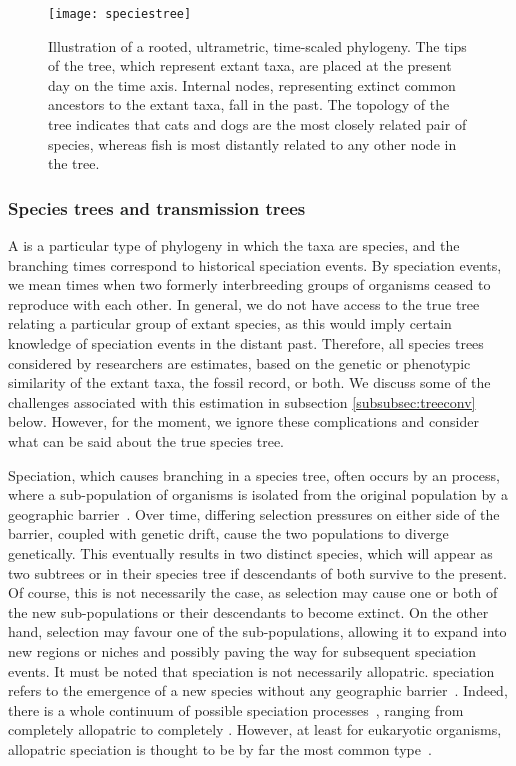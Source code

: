 \begin{figure}[ht]
  \centering
  \label{fig:speciestree}
  \texttt{[image: speciestree]}
  \caption[Illustration of a rooted, ultrametric, time-scaled phylogeny]
    {Illustration of a rooted, ultrametric, time-scaled phylogeny. The tips of
      the tree, which represent extant taxa, are placed at the present day on
      the time axis. Internal nodes, representing extinct common ancestors to
      the extant taxa, fall in the past. The topology of the tree indicates
      that cats and dogs are the most closely related pair of species, whereas
      fish is most distantly related to any other node in the tree.}
\end{figure}

\subsubsection{Species trees and transmission trees}
\label{subsubsec:speciestree}

A  is a particular type of phylogeny in which the taxa are
species, and the branching times correspond to historical speciation events. By
speciation events, we mean times when two formerly interbreeding groups of
organisms ceased to reproduce with each other. In general, we do not have
access to the true tree relating a particular group of extant species, as this
would imply certain knowledge of speciation events in the distant past.
Therefore, all species trees considered by researchers are estimates, based on
the genetic or phenotypic similarity of the extant taxa, the fossil record, or
both. We discuss some of the challenges associated with this estimation in
subsection \ref{subsubsec:treeconv} below. However, for the moment, we ignore
these complications and consider what can be said about the true species tree.

Speciation, which causes branching in a species tree, often occurs by an
 process, where a sub-population of organisms is isolated from
the original population by a geographic barrier~\autocite{coyne2004speciation}.
Over time, differing selection pressures on either side of the barrier, coupled
with genetic drift, cause the two populations to diverge genetically. This
eventually results in two distinct species, which will appear as two subtrees
or  in their species tree if descendants of both survive to the
present. Of course, this is not necessarily the case, as selection may cause
one or both of the new sub-populations or their descendants to become extinct.
On the other hand, selection may favour one of the sub-populations, allowing it
to expand into new regions or niches and possibly paving the way for subsequent
speciation events. It must be noted that speciation is not necessarily
allopatric.  speciation refers to the emergence of a new
species without any geographic barrier~\autocite{coyne2004speciation}. Indeed,
there is a whole continuum of possible speciation
processes~\autocite{fitzpatrick2008if}, ranging from completely allopatric to
completely . However, at least for eukaryotic organisms,
allopatric speciation is thought to be by far the most common
type~\autocite{coyne2004speciation}.

